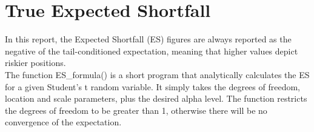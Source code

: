 \documentclass[11pt, a4paper]{article}
\begin{document}





\tableofcontents
\newpage
	


\setcounter{page}{1}

\section{True Expected Shortfall}

In this report, the Expected Shortfall (ES) figures are always reported as the negative of the tail-conditioned expectation, meaning that higher values depict riskier positions. \\

The function ES\_formula() is a short program that analytically calculates the ES for a given Student's t random variable. It simply takes the degrees of freedom, location and scale parameters, plus the desired alpha level. The function restricts the degrees of freedom to be greater than 1, otherwise there will be no convergence of the expectation.
\end{document}
